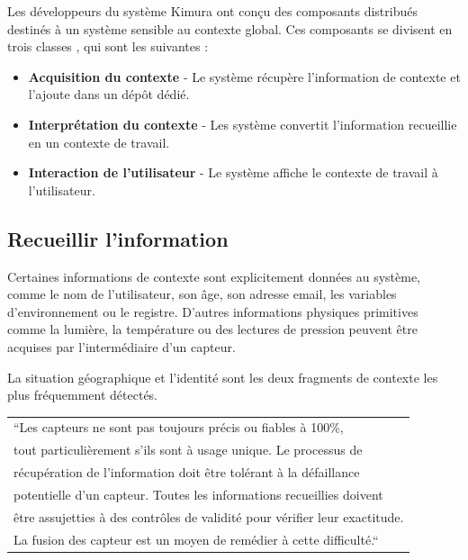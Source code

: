 Les développeurs du système Kimura ont conçu des composants distribués destinés
à un système sensible au contexte global. Ces composants se divisent en trois
classes \cite{voida_integrating_2002}, qui sont les suivantes :

\begin{itemize}
    \item \textbf{Acquisition du contexte} - Le système récupère l'information de
        contexte et l'ajoute dans un dépôt dédié.
    \item \textbf{Interprétation du contexte} - Les système convertit
        l'information recueillie en un contexte de travail.
    \item \textbf{Interaction de l'utilisateur} - Le système affiche le contexte
        de travail à l'utilisateur.
\end{itemize}

\subsection{Recueillir l'information}

Certaines informations de contexte sont explicitement données au système, comme
le nom de l'utilisateur, son âge, son adresse email, les variables
d'environnement ou le registre. D'autres informations physiques primitives comme
la lumière, la température ou des lectures de pression peuvent être acquises par
l'intermédiaire d'un capteur.

La situation géographique et l'identité sont les deux fragments de contexte les
plus fréquemment détectés.

{%
  \centering
  \begin{tabular}{l}
    ``Les capteurs ne sont pas toujours précis ou fiables à 100\%, \\
    tout particulièrement s'ils sont à usage unique. Le processus de \\
    récupération de l'information doit être tolérant à la défaillance \\
    potentielle d'un capteur. Toutes les informations recueillies doivent \\
    être assujetties à des contrôles de validité pour vérifier leur exactitude.\\
    La fusion des capteur est un moyen de remédier à cette difficulté.``
    \cite{schmidt_there_1999} \\
  \end{tabular}
}%

